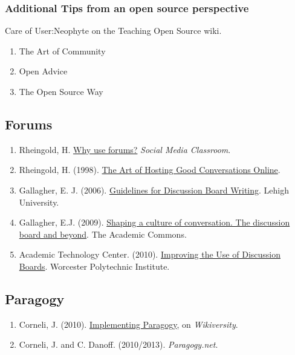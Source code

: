 \subsubsection{Additional Tips from an open source
perspective}\label{rec:additional-tips-from-an-open-source-perspective}

Care of User:Neophyte on the Teaching Open Source wiki.

\begin{enumerate}
\def\labelenumi{\arabic{enumi}.}
\item
  The Art of Community
\item
  Open Advice
\item
  The Open Source Way
\end{enumerate}

\subsection{Forums}\label{rec:forums}

\begin{enumerate}
\def\labelenumi{\arabic{enumi}.}
\item
  Rheingold, H. \href{http://blip.tv/file/1123048}{Why use forums?}
  \emph{Social Media Classroom}.
\item
  Rheingold, H. (1998).
  \href{http://www.rheingold.com/texts/artonlinehost.html}{The Art of
  Hosting Good Conversations Online}.
\item
  Gallagher, E. J. (2006).
  \href{http://www.lehigh.edu/~indiscus/doc_guidelines.html}{Guidelines
  for Discussion Board Writing}. Lehigh University.
\item
  Gallagher, E.J. (2009).
  \href{http://www.academiccommons.org/2009/01/shaping-a-culture-of-conversation-the-discussion-board-and-beyond/}{Shaping
  a culture of conversation. The discussion board and beyond}. The
  Academic Commons.
\item
  Academic Technology Center. (2010).
  \href{http://www.wpi.edu/Academics/ATC/Collaboratory/Idea/boards.html}{Improving
  the Use of Discussion Boards}. Worcester Polytechnic Institute.
\end{enumerate}

\subsection{Paragogy}\label{rec:paragogy}

\begin{enumerate}
\def\labelenumi{\arabic{enumi}.}
\item
  Corneli, J. (2010).
  \href{http://metameso.org/~joe/docs/paragogy-lesson.pdf}{Implementing
  Paragogy}, on \emph{Wikiversity}.
\item
  Corneli, J. and C. Danoff. (2010/2013). \emph{Paragogy.net}.
\end{enumerate}

